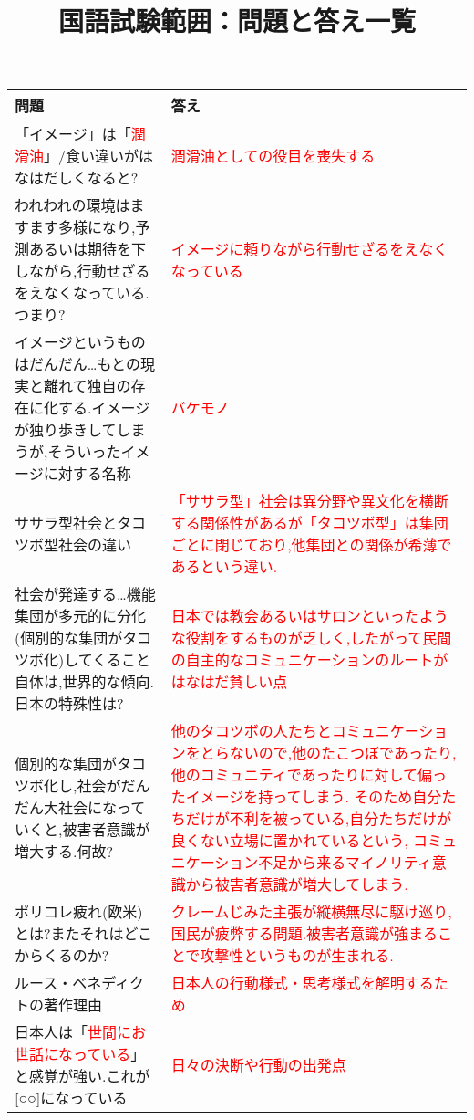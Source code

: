\documentclass[a4paper,10pt]{article}
\title{国語試験範囲：問題と答え一覧}
\date{}
\begin{document}
\maketitle
\vspace{-2cm}
\begin{longtable}{|p{}|p{}|}
\hline
\textbf{問題} & \textbf{答え} \\ \hline
    「イメージ」は「\textcolor{red}{潤滑油}」/食い違いがはなはだしくなると? & \textcolor{red}{潤滑油としての役目を喪失する} \\ \hline
    われわれの環境はますます多様になり,予測あるいは期待を下しながら,行動せざるをえなくなっている.つまり? & \textcolor{red}{イメージに頼りながら行動せざるをえなくなっている} \\ \hline
    イメージというものはだんだん…もとの現実と離れて独自の存在に化する.イメージが独り歩きしてしまうが,そういったイメージに対する名称 & \textcolor{red}{バケモノ} \\ \hline
    ササラ型社会とタコツボ型社会の違い & \textcolor{red}{「ササラ型」社会は異分野や異文化を横断する関係性があるが「タコツボ型」は集団ごとに閉じており,他集団との関係が希薄であるという違い.} \\ \hline
    社会が発達する…機能集団が多元的に分化(個別的な集団がタコツボ化)してくること自体は,世界的な傾向.日本の特殊性は?& \textcolor{red}{日本では教会あるいはサロンといったような役割をするものが乏しく,したがって民間の自主的なコミュニケーションのルートがはなはだ貧しい点} \\ \hline
    個別的な集団がタコツボ化し,社会がだんだん大社会になっていくと,被害者意識が増大する.何故? & \textcolor{red}{他のタコツボの人たちとコミュニケーションをとらないので,他のたこつぼであったり,他のコミュニティであったりに対して偏ったイメージを持ってしまう. そのため自分たちだけが不利を被っている,自分たちだけが良くない立場に置かれているという, コミュニケーション不足から来るマイノリティ意識から被害者意識が増大してしまう.} \\ \hline
    ポリコレ疲れ(欧米)とは?またそれはどこからくるのか? & \textcolor{red}{クレームじみた主張が縦横無尽に駆け巡り,国民が疲弊する問題.被害者意識が強まることで攻撃性というものが生まれる.} \\ \hline\hline
    ルース・ベネディクトの著作理由 & \textcolor{red}{日本人の行動様式・思考様式を解明するため} \\ \hline
    日本人は「\textcolor{red}{世間にお世話になっている}」と感覚が強い.これが[○○]になっている & \textcolor{red}{日々の決断や行動の出発点} \\ \hline

\end{longtable}
\end{document}
